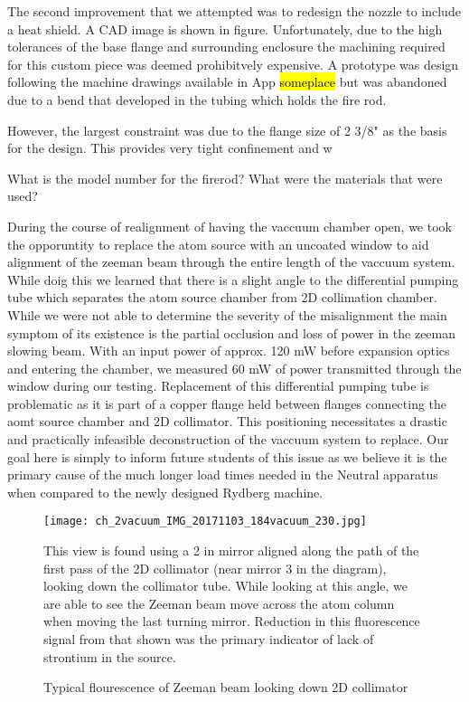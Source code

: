 The second improvement that we attempted was to redesign the nozzle to include a heat shield. A CAD image is shown in figure. Unfortunately, due to the high tolerances of the base flange and surrounding enclosure the machining required for this custom piece was deemed prohibitvely expensive. A prototype was design following the machine drawings available in App \hl{someplace} but was abandoned due to a bend that developed in the tubing which holds the fire rod. 

However, the largest constraint was due to the flange size of 2 3/8" as the basis for the design. This provides very tight confinement and w

What is the model number for the firerod? What were the materials that were used? 

During the course of realignment of having the vaccuum chamber open, we took the opporuntity to replace the atom source with an uncoated window to aid alignment of the zeeman beam through the entire length of the vaccuum system. While doig this we learned that there is a slight angle to the differential pumping tube which separates the atom source chamber from 2D collimation chamber. While we were not able to determine the severity of the misalignment the main symptom of its existence is the partial occlusion and loss of power in the zeeman slowing beam. With an input power of approx. 120 mW before expansion optics and entering the chamber, we measured 60 mW of power transmitted through the window during our testing. Replacement of this differential pumping tube is problematic as it is part of a copper flange held between flanges connecting the aomt source chamber and 2D collimator. This positioning necessitates a drastic and practically infeasible deconstruction of the vaccuum system to replace. Our goal here is simply to inform future students of this issue as we believe it is the primary cause of the much longer load times needed in the Neutral apparatus when compared to the newly designed Rydberg machine.


	\begin{figure}
		\centerline{
		\texttt{[image: ch\_2vacuum\_IMG\_20171103\_184vacuum\_230.jpg]}}
		\caption{Typical flourescence of Zeeman beam looking down 2D collimator}{This view is found using a 2 in mirror aligned along the path of the first pass of the 2D collimator (near mirror 3 in the diagram), looking down the collimator tube. While looking at this angle, we are able to see the Zeeman beam move across the atom column when moving the last turning mirror. Reduction in this fluorescence signal from that shown was the primary indicator of lack of strontium in the source.}
		\label{fig:2d_coll_flourescence}
	\end{figure} 
	

